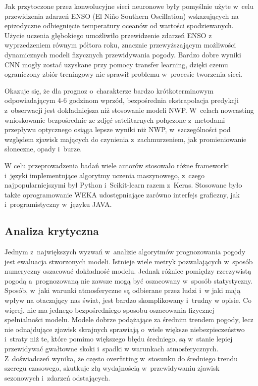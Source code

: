 Jak przytoczone przez \cite{ai-revolutionises-weather-prediction}
konwolucyjne sieci neuronowe były pomyślnie użyte w~celu przewidzenia zdarzeń ENSO 
(El Niño Southern Oscillation) wskazujących na epizodyczne odbiegnięcie temperatury oceanów 
od wartości spodziewanych. Użycie uczenia głębokiego umożliwiło przewidzenie zdarzeń ENSO z~
wyprzedzeniem równym półtora roku, znacznie przewyższającym możliwości dynamicznych modeli
fizycznych przewidywania pogody. Bardzo dobre wyniki CNN mogły zostać uzyskane przy pomocy
transfer learning, dzięki czemu ograniczony zbiór treningowy nie sprawił problemu w~procesie 
tworzenia sieci.

Okazuje się, że dla prognoz o~charakterze bardzo krótkoterminowym odpowiadającym 4-6 godzinom 
wprzód, bezpośrednia ekstrapolacja predykcji z~obserwacji jest dokładniejsza niż 
stosowanie modeli NWP\cite{ai-revolutionises-weather-prediction}. W~celach nowcasting
wnioskowanie bezpośrednie ze zdjęć satelitarnych połączone z~metodami przepływu optycznego osiąga
lepsze wyniki niż NWP, w~szczególności pod względem zjawisk mających do czynienia z~zachmurzeniem,
jak promieniowanie słoneczne, opady i~burze. 

W celu przeprowadzenia badań wiele autorów stosowało różne frameworki i~języki implementujące algorytmy uczenia
maszynowego, z~czego najpopularniejszymi był Python\cite{python} i~Scikit-learn\cite{sklearn}
razem z~Keras\cite{keras}. Stosowane było także oprogramowanie WEKA udostępniające zarówno interfejs
graficzny, jak i~programistyczny w~języku JAVA.


\subsection{Analiza krytyczna}

Jednym z~największych wyzwań w~analizie algorytmów prognozowania pogody jest ewaluacja 
stworzonych modeli. Istnieje wiele metryk pozwalających w~sposób numeryczny oszacować
dokładność modelu. Jednak różnice pomiędzy rzeczywistą pogodą a~prognozowaną nie zawsze
mogą być oszacowany w~sposób statystyczny. Sposób, w~jaki warunki atmosferyczne są odbierane
przez ludzi i~w jaki mają wpływ na otaczający nas świat, jest bardzo skomplikowany i~trudny
w opisie. Co więcej, nie ma jednego bezpośredniego sposobu oszacowania fizycznej spełnialności
modelu\cite{deep-learning-for-improving-numerical}.
Modele dobrze podążające za średnim trendem pogody, lecz nie odnajdujące
zjawisk skrajnych sprawiają o~wiele większe niebezpieczeństwo i~straty niż te, które
pomimo większego błędu średniego, są w~stanie lepiej przewidywać gwałtowne skoki i~spadki
w warunkach atmosferycznych. Z~doświadczeń wynika, że często overfitting w~stosunku do
średniego trendu szeregu czasowego, skutkuje złą wydajnością w~przewidywaniu
zjawisk sezonowych i~zdarzeń odstających.

